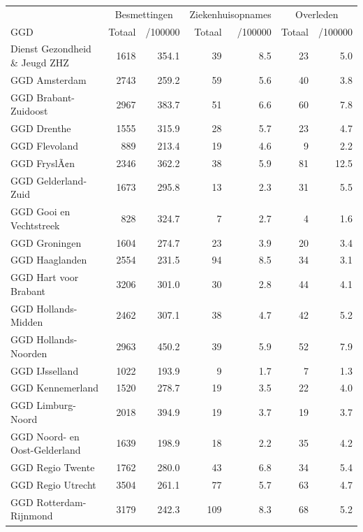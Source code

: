 \documentclass[
  english,
  man,floatsintext]{apa6}
\begin{document}
\begin{table}[H]
\centering\begingroup\fontsize{10}{12}\selectfont

\begin{threeparttable}
\begin{tabular}{lrrrrrr}
\toprule
\multicolumn{1}{c}{ } & \multicolumn{2}{c}{Besmettingen} & \multicolumn{2}{c}{Ziekenhuisopnames} & \multicolumn{2}{c}{Overleden} \\
\cmidrule(l{3pt}r{3pt}){2-3} \cmidrule(l{3pt}r{3pt}){4-5} \cmidrule(l{3pt}r{3pt}){6-7}
GGD & Totaal & /100000 & Totaal & /100000 & Totaal & /100000\\
\midrule
Dienst Gezondheid \& Jeugd ZHZ & 1618 & 354.1 & 39 & 8.5 & 23 & 5.0\\
GGD Amsterdam & 2743 & 259.2 & 59 & 5.6 & 40 & 3.8\\
GGD Brabant-Zuidoost & 2967 & 383.7 & 51 & 6.6 & 60 & 7.8\\
GGD Drenthe & 1555 & 315.9 & 28 & 5.7 & 23 & 4.7\\
GGD Flevoland & 889 & 213.4 & 19 & 4.6 & 9 & 2.2\\
GGD FryslÃ¢n & 2346 & 362.2 & 38 & 5.9 & 81 & 12.5\\
GGD Gelderland-Zuid & 1673 & 295.8 & 13 & 2.3 & 31 & 5.5\\
GGD Gooi en Vechtstreek & 828 & 324.7 & 7 & 2.7 & 4 & 1.6\\
GGD Groningen & 1604 & 274.7 & 23 & 3.9 & 20 & 3.4\\
GGD Haaglanden & 2554 & 231.5 & 94 & 8.5 & 34 & 3.1\\
GGD Hart voor Brabant & 3206 & 301.0 & 30 & 2.8 & 44 & 4.1\\
GGD Hollands-Midden & 2462 & 307.1 & 38 & 4.7 & 42 & 5.2\\
GGD Hollands-Noorden & 2963 & 450.2 & 39 & 5.9 & 52 & 7.9\\
GGD IJsselland & 1022 & 193.9 & 9 & 1.7 & 7 & 1.3\\
GGD Kennemerland & 1520 & 278.7 & 19 & 3.5 & 22 & 4.0\\
GGD Limburg-Noord & 2018 & 394.9 & 19 & 3.7 & 19 & 3.7\\
GGD Noord- en Oost-Gelderland & 1639 & 198.9 & 18 & 2.2 & 35 & 4.2\\
GGD Regio Twente & 1762 & 280.0 & 43 & 6.8 & 34 & 5.4\\
GGD Regio Utrecht & 3504 & 261.1 & 77 & 5.7 & 63 & 4.7\\
GGD Rotterdam-Rijnmond & 3179 & 242.3 & 109 & 8.3 & 68 & 5.2\\

\end{tabular}
\end{threeparttable}
\end{table}
\end{document}
